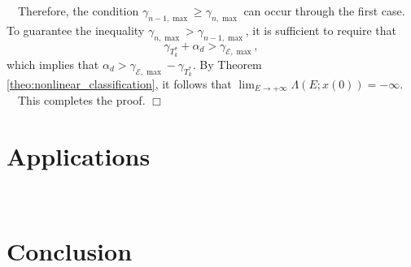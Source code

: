 \documentclass[11pt,a4paper]{article}
\begin{document}
~~Therefore, the condition $\gamma_{n-1, \max} \geq \gamma_{n, \max}$ can occur through the first case. To guarantee the inequality $\gamma_{n, \max} > \gamma_{n-1, \max}$, it is sufficient to require that
\begin{equation}
\gamma_{T_k^*} + \alpha_d > \gamma_{\mathcal{E}, \max},
\end{equation}
which implies that $\alpha_d > \gamma_{\mathcal{E}, \max} - \gamma_{T_k^*}$. By Theorem \ref{theo:nonlinear_classification}, it follows that $\lim_{E \to +\infty}\Lambda(E;x(0)) = -\infty$.\\
~~This completes the proof. \hfill $\Box$
\section{Applications}
~~
\section{Conclusion}
~~
\end{document}
